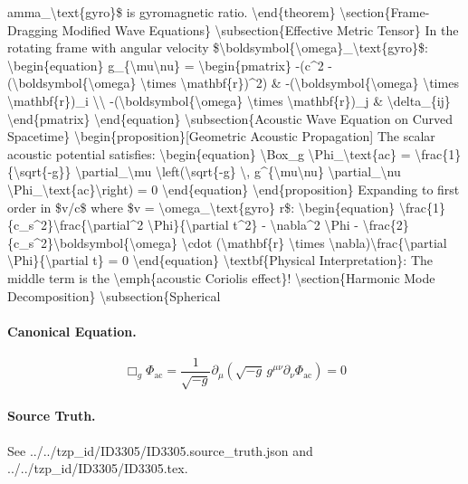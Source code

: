 amma\_\textbackslash{}text\{gyro\}\$ is gyromagnetic ratio. \textbackslash{}end\{theorem\} \textbackslash{}section\{Frame-Dragging Modified Wave Equations\} \textbackslash{}subsection\{Effective Metric Tensor\} In the rotating frame with angular velocity \$\textbackslash{}boldsymbol\{\textbackslash{}omega\}\_\textbackslash{}text\{gyro\}\$: \textbackslash{}begin\{equation\} g\_\{\textbackslash{}mu\textbackslash{}nu\} = \textbackslash{}begin\{pmatrix\} -(c\textasciicircum{}2 - (\textbackslash{}boldsymbol\{\textbackslash{}omega\} \textbackslash{}times \textbackslash{}mathbf\{r\})\textasciicircum{}2) \& -(\textbackslash{}boldsymbol\{\textbackslash{}omega\} \textbackslash{}times \textbackslash{}mathbf\{r\})\_i \textbackslash{}\textbackslash{} -(\textbackslash{}boldsymbol\{\textbackslash{}omega\} \textbackslash{}times \textbackslash{}mathbf\{r\})\_j \& \textbackslash{}delta\_\{ij\} \textbackslash{}end\{pmatrix\} \textbackslash{}end\{equation\} \textbackslash{}subsection\{Acoustic Wave Equation on Curved Spacetime\} \textbackslash{}begin\{proposition\}[Geometric Acoustic Propagation] The scalar acoustic potential satisfies: \textbackslash{}begin\{equation\} \textbackslash{}Box\_g \textbackslash{}Phi\_\textbackslash{}text\{ac\} = \textbackslash{}frac\{1\}\{\textbackslash{}sqrt\{-g\}\} \textbackslash{}partial\_\textbackslash{}mu \textbackslash{}left(\textbackslash{}sqrt\{-g\} \textbackslash{}, g\textasciicircum{}\{\textbackslash{}mu\textbackslash{}nu\} \textbackslash{}partial\_\textbackslash{}nu \textbackslash{}Phi\_\textbackslash{}text\{ac\}\textbackslash{}right) = 0 \textbackslash{}end\{equation\} \textbackslash{}end\{proposition\} Expanding to first order in \$v/c\$ where \$v = \textbackslash{}omega\_\textbackslash{}text\{gyro\} r\$: \textbackslash{}begin\{equation\} \textbackslash{}frac\{1\}\{c\_s\textasciicircum{}2\}\textbackslash{}frac\{\textbackslash{}partial\textasciicircum{}2 \textbackslash{}Phi\}\{\textbackslash{}partial t\textasciicircum{}2\} - \textbackslash{}nabla\textasciicircum{}2 \textbackslash{}Phi - \textbackslash{}frac\{2\}\{c\_s\textasciicircum{}2\}\textbackslash{}boldsymbol\{\textbackslash{}omega\} \textbackslash{}cdot (\textbackslash{}mathbf\{r\} \textbackslash{}times \textbackslash{}nabla)\textbackslash{}frac\{\textbackslash{}partial \textbackslash{}Phi\}\{\textbackslash{}partial t\} = 0 \textbackslash{}end\{equation\} \textbackslash{}textbf\{Physical Interpretation\}: The middle term is the \textbackslash{}emph\{acoustic Coriolis effect\}! \textbackslash{}section\{Harmonic Mode Decomposition\} \textbackslash{}subsection\{Spherical

\paragraph{Canonical Equation.}
\[
\begin{equation} \Box_g \Phi_ \text{ac} = \frac{1}{ \sqrt{-g}} \partial_ \mu \left( \sqrt{-g} \, g^{ \mu \nu} \partial_ \nu \Phi_ \text{ac} \right) = 0 \end{equation}
\]

\paragraph{Source Truth.}
See ../../tzp\_id/ID3305/ID3305.source\_truth.json and ../../tzp\_id/ID3305/ID3305.tex.
